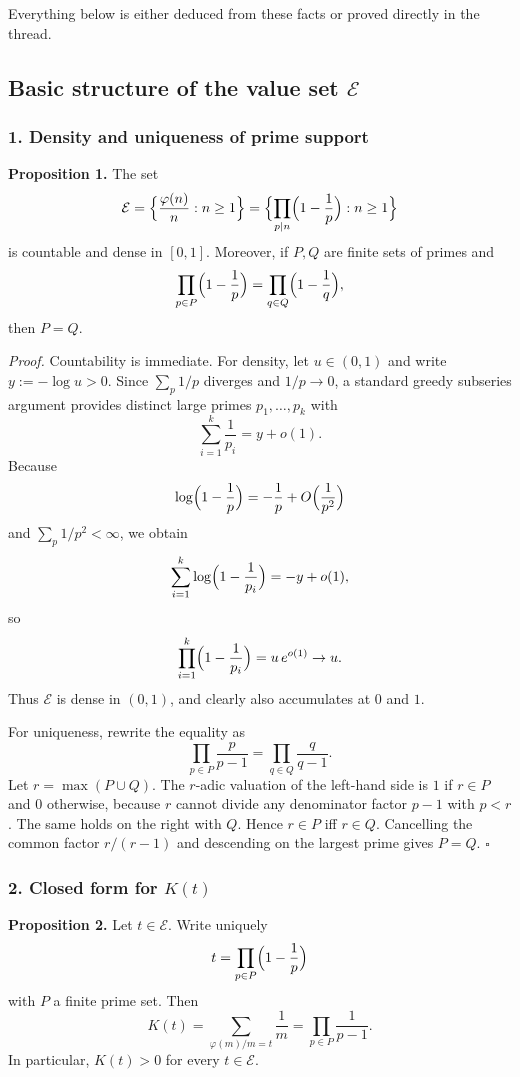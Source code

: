 Everything below is either deduced from these facts or proved directly in the thread.

\subsection{Basic structure of the value set $\mathcal E$}

\subsubsection*{1. Density and uniqueness of prime support}

\noindent\textbf{Proposition 1.}
The set
\[
\mathcal E=\Bigl\{\frac{\varphi(n)}n:n\ge1\Bigr\}
=\Bigl\{\prod_{p\mid n}\Bigl(1-\frac1p\Bigr):n\ge1\Bigr\}
\]
is countable and dense in $[0,1]$.
Moreover, if $P,Q$ are finite sets of primes and
\[
\prod_{p\in P}\Bigl(1-\frac1p\Bigr)=\prod_{q\in Q}\Bigl(1-\frac1q\Bigr),
\]
then $P=Q$.

\medskip
\noindent\textit{Proof.}
Countability is immediate. For density, let $u\in(0,1)$ and write $y:=-\log u>0$. Since $\sum_p 1/p$ diverges and $1/p\to0$, a standard greedy subseries argument provides distinct large primes $p_1,\dots,p_k$ with
\[
\sum_{i=1}^k\frac1{p_i}=y+o(1).
\]
Because
\[
\log\Bigl(1-\frac1p\Bigr)=-\frac1p+O\Bigl(\frac1{p^2}\Bigr)
\]
and $\sum_p 1/p^2<\infty$, we obtain
\[
\sum_{i=1}^k\log\Bigl(1-\frac1{p_i}\Bigr)=-y+o(1),
\]
so
\[
\prod_{i=1}^k\Bigl(1-\frac1{p_i}\Bigr)=u\,e^{o(1)}\to u.
\]
Thus $\mathcal E$ is dense in $(0,1)$, and clearly also accumulates at $0$ and $1$.

For uniqueness, rewrite the equality as
\[
\prod_{p\in P}\frac{p}{p-1}=\prod_{q\in Q}\frac{q}{q-1}.
\]
Let $r=\max(P\cup Q)$. The $r$-adic valuation of the left-hand side is $1$ if $r\in P$ and $0$ otherwise, because $r$ cannot divide any denominator factor $p-1$ with $p<r$. The same holds on the right with $Q$. Hence $r\in P$ iff $r\in Q$. Cancelling the common factor $r/(r-1)$ and descending on the largest prime gives $P=Q$. \hfill$\square$

\subsubsection*{2. Closed form for $K(t)$}

\noindent\textbf{Proposition 2.}
Let $t\in\mathcal E$. Write uniquely
\[
t=\prod_{p\in P}\Bigl(1-\frac1p\Bigr)
\]
with $P$ a finite prime set. Then
\[
K(t)=\sum_{\varphi(m)/m=t}\frac1m=\prod_{p\in P}\frac1{p-1}.
\]
In particular, $K(t)>0$ for every $t\in\mathcal E$.

